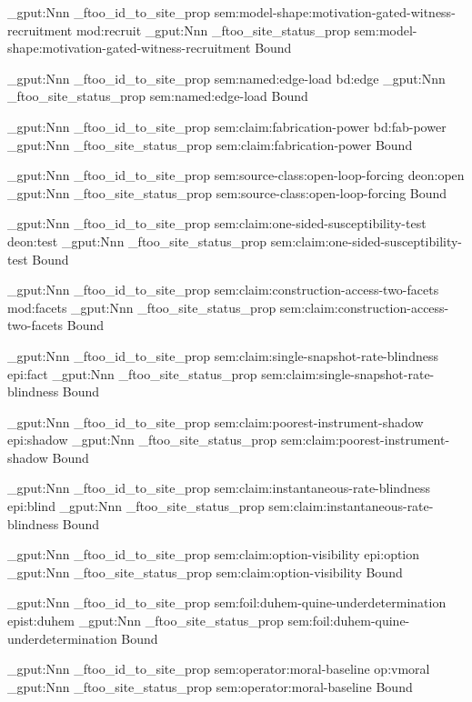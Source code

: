 \prop_gput:Nnn \g_ftoo_id_to_site_prop { sem:model-shape:motivation-gated-witness-recruitment } { mod:recruit }
\prop_gput:Nnn \g_ftoo_site_status_prop { sem:model-shape:motivation-gated-witness-recruitment } { Bound }

\prop_gput:Nnn \g_ftoo_id_to_site_prop { sem:named:edge-load } { bd:edge }
\prop_gput:Nnn \g_ftoo_site_status_prop { sem:named:edge-load } { Bound }

\prop_gput:Nnn \g_ftoo_id_to_site_prop { sem:claim:fabrication-power } { bd:fab-power }
\prop_gput:Nnn \g_ftoo_site_status_prop { sem:claim:fabrication-power } { Bound }

\prop_gput:Nnn \g_ftoo_id_to_site_prop { sem:source-class:open-loop-forcing } { deon:open }
\prop_gput:Nnn \g_ftoo_site_status_prop { sem:source-class:open-loop-forcing } { Bound }

\prop_gput:Nnn \g_ftoo_id_to_site_prop { sem:claim:one-sided-susceptibility-test } { deon:test }
\prop_gput:Nnn \g_ftoo_site_status_prop { sem:claim:one-sided-susceptibility-test } { Bound }

\prop_gput:Nnn \g_ftoo_id_to_site_prop { sem:claim:construction-access-two-facets } { mod:facets }
\prop_gput:Nnn \g_ftoo_site_status_prop { sem:claim:construction-access-two-facets } { Bound }

\prop_gput:Nnn \g_ftoo_id_to_site_prop { sem:claim:single-snapshot-rate-blindness } { epi:fact }
\prop_gput:Nnn \g_ftoo_site_status_prop { sem:claim:single-snapshot-rate-blindness } { Bound }

\prop_gput:Nnn \g_ftoo_id_to_site_prop { sem:claim:poorest-instrument-shadow } { epi:shadow }
\prop_gput:Nnn \g_ftoo_site_status_prop { sem:claim:poorest-instrument-shadow } { Bound }

\prop_gput:Nnn \g_ftoo_id_to_site_prop { sem:claim:instantaneous-rate-blindness } { epi:blind }
\prop_gput:Nnn \g_ftoo_site_status_prop { sem:claim:instantaneous-rate-blindness } { Bound }

\prop_gput:Nnn \g_ftoo_id_to_site_prop { sem:claim:option-visibility } { epi:option }
\prop_gput:Nnn \g_ftoo_site_status_prop { sem:claim:option-visibility } { Bound }

\prop_gput:Nnn \g_ftoo_id_to_site_prop { sem:foil:duhem-quine-underdetermination } { epist:duhem }
\prop_gput:Nnn \g_ftoo_site_status_prop { sem:foil:duhem-quine-underdetermination } { Bound }

\prop_gput:Nnn \g_ftoo_id_to_site_prop { sem:operator:moral-baseline } { op:vmoral }
\prop_gput:Nnn \g_ftoo_site_status_prop { sem:operator:moral-baseline } { Bound }

